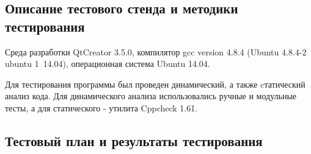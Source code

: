 \documentclass[12pt,a4paper]{report}
\begin{document}
\subsection{Описание тестового стенда и методики тестирования}
\hspace{\parindent}
Среда разработки QtCreator 3.5.0, компилятор gcc version 4.8.4 (Ubuntu 4.8.4-2 ubuntu 1~14.04), операционная система Ubuntu 14.04. 

Для тестирования программы был проведен динамический, а также cтатический анализ кода. Для динамического анализа использовались ручные и модульные тесты, а для статического - утилита Cppcheck 1.61.

\subsection{Тестовый план и результаты тестирования}
\end{document}
